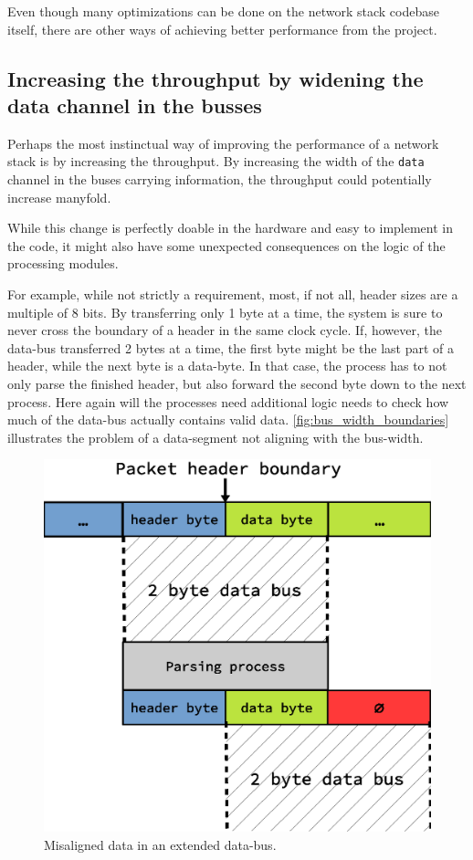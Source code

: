 Even though many optimizations can be done on the network stack codebase
itself, there are other ways of achieving better performance from the project.

\subsection{Increasing the throughput by widening the data channel in the
busses}
Perhaps the most instinctual way of improving the performance of a network
stack is by increasing the throughput. By increasing the width of the
\texttt{data} channel in the buses carrying information, the throughput could
potentially increase manyfold.

While this change is perfectly doable in the hardware and easy to implement in
the code, it might also have some unexpected consequences on the logic of the
processing modules.

For example, while not strictly a requirement, most, if not all, header sizes
are a multiple of 8 bits. By transferring only 1 byte at a time, the system is
sure to never cross the boundary of a header in the same clock cycle. If,
however, the data-bus transferred 2 bytes at a time, the first byte might be
the last part of a header, while the next byte is a data-byte. In that case,
the process has to not only parse the finished header, but also forward the
second byte down to the next process. Here again will the processes need
additional logic needs to check how much of the data-bus actually contains
valid data. \autoref{fig:bus_width_boundaries} illustrates the problem of a
data-segment not aligning with the bus-width.

\begin{figure}
\centering
\includegraphics[width=\linewidth]{discussion/bus_width_boundaries.eps}
\caption{Misaligned data in an extended data-bus. }
\label{fig:bus_width_boundaries}
\end{figure}





